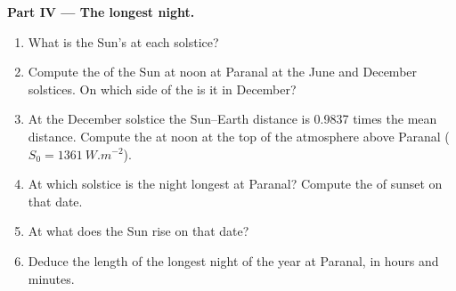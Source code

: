 \begin{problem}
\medskip
\noindent\textbf{Part IV --- The longest night.}
\begin{enumerate}[resume]
  \item What is the Sun's  at each solstice?
  \item Compute the  of the Sun at noon at Paranal at the June and
        December solstices. On which side of the  is it in December?
  \item At the December solstice the Sun--Earth distance is 0.9837 times the
        mean distance. Compute the  at noon at the top of the
        atmosphere above Paranal ($S_0 = \qty{1361}{W.m^{-2}}$).
  \item At which solstice is the night longest at Paranal? Compute the  of sunset on that date.
  \item At what  does the Sun rise on that date?
  \item Deduce the length of the longest night of the year at Paranal, in
        hours and minutes.
\end{enumerate}
\end{problem}
